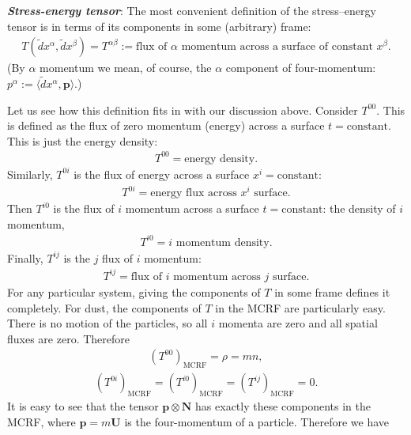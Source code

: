 \documentclass[12pt]{book}
\begin{document}
    \textit{\textbf{Stress-energy tensor}}:
    The most convenient definition of the stress–energy tensor is in terms of its components in some (arbitrary) frame:
    \begin{align}
    T(\tilde{d}x^\alpha, \tilde{d}x^\beta) = T^{\alpha\beta} := \text{flux of \(\alpha\) momentum across a surface of constant \(x^\beta\)}. \tag{4.14}
    \end{align}
    (By \(\alpha\) momentum we mean, of course, the \(\alpha\) component of four-momentum: \(p^\alpha := \langle \tilde{d}x^\alpha, \mathbf{p} \rangle\).)

    Let us see how this definition fits in with our discussion above. Consider \(T^{00}\). This is defined as the flux of zero momentum (energy) across a surface \(t = \text{constant}\). This is just the energy density:
    \begin{align}
    T^{00} = \text{energy density}. \tag{4.15}
    \end{align}
    Similarly, \(T^{0i}\) is the flux of energy across a surface \(x^i = \text{constant}\):
    \begin{align}
    T^{0i} = \text{energy flux across \(x^i\) surface}. \tag{4.16}
    \end{align}
    Then \(T^{i0}\) is the flux of \(i\) momentum across a surface \(t = \text{constant}\): the density of \(i\) momentum,
    \begin{align}
    T^{i0} = \text{\(i\) momentum density}. \tag{4.17}
    \end{align}
    Finally, \(T^{ij}\) is the \(j\) flux of \(i\) momentum:
    \begin{align}
    T^{ij} = \text{flux of \(i\) momentum across \(j\) surface}. \tag{4.18}
    \end{align}
    For any particular system, giving the components of \(T\) in some frame defines it completely. For dust, the components of \(T\) in the MCRF are particularly easy. There is no motion of the particles, so all \(i\) momenta are zero and all spatial fluxes are zero. Therefore
    \begin{align}
    (T^{00})_{\text{MCRF}} = \rho = mn,
    \end{align}
    \begin{align}
    (T^{0i})_{\text{MCRF}} = (T^{i0})_{\text{MCRF}} = (T^{ij})_{\text{MCRF}} = 0.
    \end{align}
    It is easy to see that the tensor \(\mathbf{p} \otimes \mathbf{N}\) has exactly these components in the MCRF, where \(\mathbf{p} = m\mathbf{U}\) is the four-momentum of a particle. Therefore we have
\end{document}
